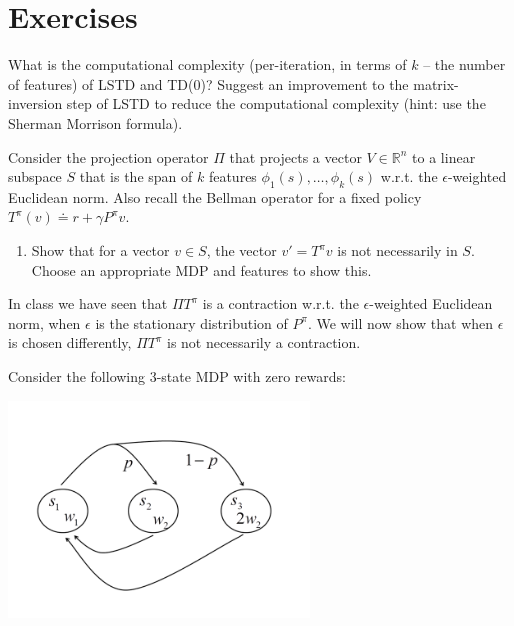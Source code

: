 \section{Exercises}

\begin{exercise}
What is the computational complexity (per-iteration, in terms of $k$ -- the number of features) of LSTD and TD(0)? Suggest an improvement to the matrix-inversion step of LSTD to reduce the computational complexity (hint: use the Sherman Morrison formula).
\end{exercise}

\begin{exercise}
Consider the projection operator $\Pi $ that projects a vector $V\in \mathbb R^n$ to a linear subspace $S$ that is the span of $k$ features ${\phi _1}(s), \ldots ,{\phi _k}(s)$ w.r.t. the $\epsilon$-weighted Euclidean norm.
Also recall the Bellman operator for a fixed policy ${T^\pi }(v) \doteq r + \gamma {P^\pi }v$.

\begin{enumerate}
  \item Show that for a vector $v \in S$, the vector $v' = {T^\pi }v$ is not necessarily in $S$. Choose an appropriate MDP and features to show this.
\end{enumerate}

In class we have seen that $\Pi {T^\pi }$ is a contraction w.r.t. the  $\epsilon$-weighted Euclidean norm, when $\epsilon$ is the stationary distribution of ${P^\pi }$. We will now show that when $\epsilon$  is chosen differently, $\Pi {T^\pi }$ is not necessarily a contraction.

Consider the following 3-state MDP with zero rewards:

\begin{center}
\includegraphics[width=0.6\textwidth]{hw8_a}
\end{center}


\end{exercise}
